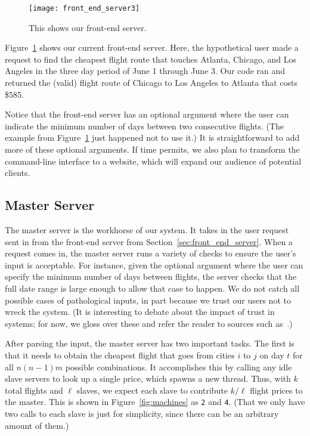 \documentclass{article}
\begin{document}
\begin{figure}[t]
\vskip 0.2in
\begin{center}
\centerline{\texttt{[image: front\_end\_server3]}}
\caption{This shows our front-end server.}
\label{fig:front_end_server}
\end{center}
\vskip -0.2in
\end{figure}

Figure~\ref{fig:front_end_server} shows our current front-end server. Here, the hypothetical user made a request to find the cheapest flight route
that touches Atlanta, Chicago, and Los Angeles in the three day period of June 1 through June 3.  Our code ran and returned the (valid) flight route
of Chicago to Los Angeles to Atlanta that costs \$585.

Notice that the front-end server has an optional argument where the user can indicate the minimum number of days between two consecutive flights. (The
example from Figure~\ref{fig:front_end_server} just happened not to use it.) It is straightforward to add more of these optional arguments. If time
permits, we also plan to transform the command-line interface to a website, which will expand our audience of potential clients.


\subsection{Master Server}\label{sec:master_server}

The master server is the workhorse of our system. It takes in the user request sent in from the front-end server from
Section~\ref{sec:front_end_server}. When a request comes in, the master server runs a variety of checks to ensure the user's input is acceptable.  For
instance, given the optional argument where the user can specify the minimum number of days between flights, the server checks that the full date
range is large enough to allow that case to happen. We do not catch all possible cases of pathological inputs, in part because we trust our users not
to wreck the system. (It is interesting to debate about the impact of trust in systems; for now, we gloss over these and refer the reader to sources
such as~\cite{Blaze:2001:RTM:380171.380186}.)

After parsing the input, the master server has two important tasks. The first is that it needs to obtain the cheapest flight that goes from cities $i$
to $j$ on day $t$ for all $n(n-1)m$ possible combinations. It accomplishes this by calling any idle slave servers to look up a single price, which
spawns a new thread. Thus, with $k$ total flights and $\ell$ slaves, we expect each slave to contribute $k/\ell$ flight prices to the master. This is
shown in Figure~\ref{fig:machines} as \texttt{2} and \texttt{4}. (That we only have two calls to each slave is just for simplicity, since there can be
an arbitrary amount of them.)
\end{document}
